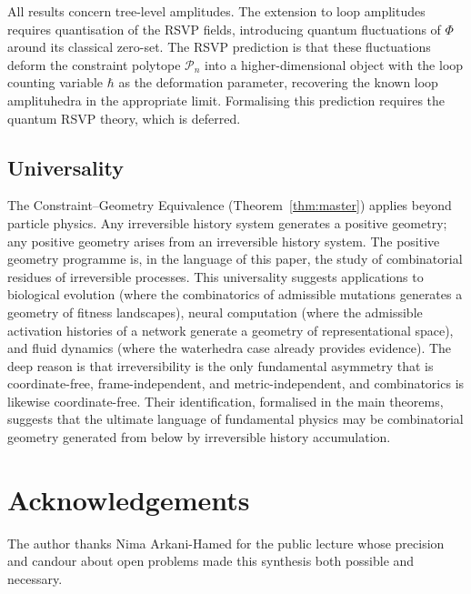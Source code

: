 \documentclass[12pt, oneside]{amsart}
\theoremstyle{plain}
\theoremstyle{definition}
\theoremstyle{remark}
\newcommand{\Phif}{\Phi}
\begin{document}
All results concern tree-level amplitudes. The extension to loop amplitudes requires quantisation of the RSVP fields, introducing quantum fluctuations of $\Phif$ around its classical zero-set. The RSVP prediction is that these fluctuations deform the constraint polytope $\mathcal{P}_n$ into a higher-dimensional object with the loop counting variable $\hbar$ as the deformation parameter, recovering the known loop amplituhedra in the appropriate limit. Formalising this prediction requires the quantum RSVP theory, which is deferred.

\subsection{Universality}

The Constraint--Geometry Equivalence (Theorem~\ref{thm:master}) applies beyond particle physics. Any irreversible history system generates a positive geometry; any positive geometry arises from an irreversible history system. The positive geometry programme is, in the language of this paper, the study of combinatorial residues of irreversible processes. This universality suggests applications to biological evolution (where the combinatorics of admissible mutations generates a geometry of fitness landscapes), neural computation (where the admissible activation histories of a network generate a geometry of representational space), and fluid dynamics (where the waterhedra case already provides evidence). The deep reason is that irreversibility is the only fundamental asymmetry that is coordinate-free, frame-independent, and metric-independent, and combinatorics is likewise coordinate-free. Their identification, formalised in the main theorems, suggests that the ultimate language of fundamental physics may be combinatorial geometry generated from below by irreversible history accumulation.

\section*{Acknowledgements}

The author thanks Nima Arkani-Hamed for the public lecture whose precision and candour about open problems made this synthesis both possible and necessary.
\end{document}
